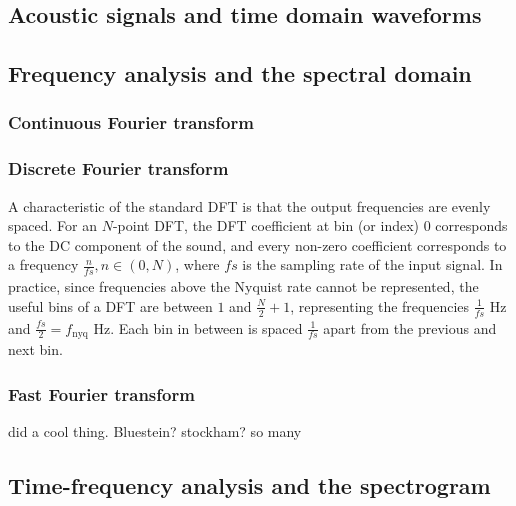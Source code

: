 \documentclass[letter,12pt,notitlepage]{article}
\begin{document}
\subsection{Acoustic signals and time domain waveforms}

\subsection{Frequency analysis and the spectral domain}

\subsubsection{Continuous Fourier transform}


\subsubsection{Discrete Fourier transform}


A characteristic of the standard DFT is that the output frequencies are evenly spaced. For an $N$-point DFT, the DFT coefficient at bin (or index) 0 corresponds to the DC component of the sound, and every non-zero coefficient corresponds to a frequency $\frac{n}{\mathit{fs}}, n \in (0, N)$, where $\mathit{fs}$ is the sampling rate of the input signal. In practice, since frequencies above the Nyquist rate cannot be represented, the useful bins of a DFT are between $1$ and $\frac{N}{2}+1$, representing the frequencies $\frac{1}{\mathit{fs}}$ Hz and $\frac{\mathit{fs}}{2} = f_{\text{nyq}}$ Hz. Each bin in between is spaced $\frac{1}{\mathit{fs}}$ apart from the previous and next bin.


\subsubsection{Fast Fourier transform}

\citet{cooleytukey} did a cool thing. Bluestein? stockham? so many

\subsection{Time-frequency analysis and the spectrogram}
\end{document}
